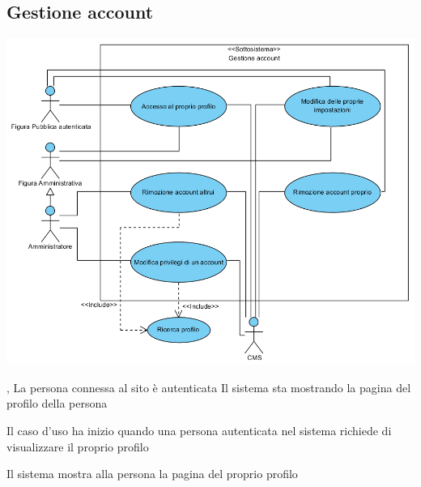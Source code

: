 \subsection{Gestione account}
\begin{center}
   \includegraphics[width=\textwidth]{assets/visualParadigm/cu/GestioneAccount}
\end{center}
{, }
{La persona connessa al sito è autenticata}
{Il sistema sta mostrando la pagina del profilo della persona}
{\begin{enumCU}
	\item Il caso d'uso ha inizio quando una persona autenticata nel sistema richiede di visualizzare il proprio profilo
	\item Il sistema mostra alla persona la pagina del proprio profilo
\end{enumCU}}


